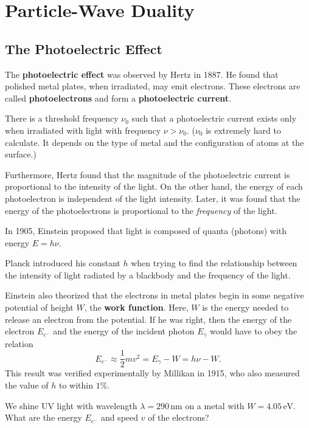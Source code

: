 \section{Particle-Wave Duality}\label{particle_wave_duality}
\subsection{The Photoelectric Effect}\label{photoelectric}

The \textbf{photoelectric effect} was observed by Hertz in 1887. He found that polished metal plates, when irradiated, may emit electrons. These electrons are called \textbf{photoelectrons} and form a \textbf{photoelectric current}.

There is a threshold frequency $\nu_0$ such that a photoelectric current exists only when irradiated with light with frequency $\nu>\nu_0$. ($\nu_0$ is extremely hard to calculate. It depends on the type of metal and the configuration of atoms at the surface.)

Furthermore, Hertz found that the magnitude of the photoelectric current is proportional to the intensity of the light. On the other hand, the energy of each photoelectron is independent of the light intensity. Later, it was found that the energy of the photoelectrons is proportional to the \textit{frequency} of the light.

In 1905, Einstein proposed that light is composed of quanta (photons) with energy $E=h\nu$.

\begin{framedrmk*}
   Planck introduced his constant $h$ when trying to find the relationship between the intensity of light radiated by a blackbody and the frequency of the light. 
\end{framedrmk*}

Einstein also theorized that the electrons in metal plates begin in some negative potential of height $W$, the \textbf{work function}. Here, $W$ is the energy needed to release an electron from the potential. If he was right, then the energy of the electron $E_{e^-}$ and the energy of the incident photon $E_{\gamma}$ would have to obey the relation $$E_{e^-}\approx\frac{1}{2}mv^2=E_{\gamma}-W=h\nu-W.$$This result was verified experimentally by Millikan in 1915, who also measured the value of $h$ to within $1\%$.

\begin{framedquest}
    We shine UV light with wavelength $\lambda=290\,\text{nm}$ on a metal with $W=4.05\,\text{eV}$. What are the energy $E_{e^-}$ and speed $v$ of the electrons?
\end{framedquest} 

